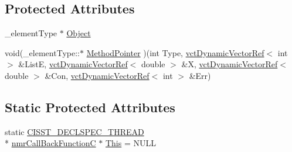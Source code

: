 \subsection*{Protected Attributes}
\begin{DoxyCompactItemize}
\item 
\-\_\-element\-Type $\ast$ \hyperlink{classnmr_call_back_function_c_ae7c7d06c6287e05a265c448de2f92693}{Object}
\item 
void(\-\_\-element\-Type\-::$\ast$ \hyperlink{classnmr_call_back_function_c_a59924530a7242156c291de2511329051}{Method\-Pointer} )(int Type, \hyperlink{classvct_dynamic_vector_ref}{vct\-Dynamic\-Vector\-Ref}$<$ int $>$ \&List\-E, \hyperlink{classvct_dynamic_vector_ref}{vct\-Dynamic\-Vector\-Ref}$<$ double $>$ \&X, \hyperlink{classvct_dynamic_vector_ref}{vct\-Dynamic\-Vector\-Ref}$<$ double $>$ \&Con, \hyperlink{classvct_dynamic_vector_ref}{vct\-Dynamic\-Vector\-Ref}$<$ int $>$ \&Err)
\end{DoxyCompactItemize}
\subsection*{Static Protected Attributes}
\begin{DoxyCompactItemize}
\item 
static \hyperlink{nmr_call_back_8h_a6e1f65051a0942715fa65ef4193e39e1}{C\-I\-S\-S\-T\-\_\-\-D\-E\-C\-L\-S\-P\-E\-C\-\_\-\-T\-H\-R\-E\-A\-D} \\*
\hyperlink{classnmr_call_back_function_c}{nmr\-Call\-Back\-Function\-C} $\ast$ \hyperlink{classnmr_call_back_function_c_afbeb6bde7ebc567dc8627ec16475ef52}{This} = N\-U\-L\-L
\end{DoxyCompactItemize}


